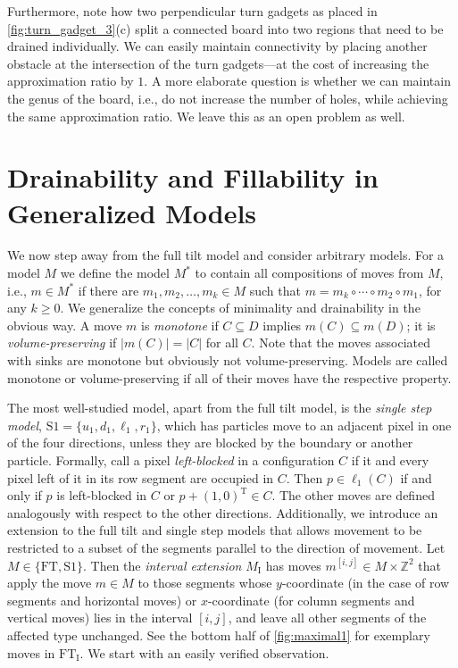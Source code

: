 \documentclass[a4paper,UKenglish,cleveref,thm-restate]{lipics-v2021}
\newcommand{\ZZ}{\ensuremath{\mathbb{Z}^2}}
\newcommand{\Tpose}{\ensuremath{\mathrm{T}}}
\newcommand{\FT}{\ensuremath{\mathrm{FT}}\xspace}
\newcommand{\SSt}{\ensuremath{\mathrm{S1}}\xspace}
\newcommand{\IE}[1][\FT]{\ensuremath{{#1}_\mathrm{I}}\xspace}
\newcommand{\mSeq}[1][k]{\ensuremath{m_1,m_2,\ldots,m_{#1}}}
\newcommand{\mComp}[1][k]{\ensuremath{m_{#1}\circ\cdots\circ m_2 \circ m_1}}
\begin{document}
Furthermore, note how two perpendicular turn gadgets as placed
in \cref{fig:turn_gadget_3}(c) split a connected board into two regions that
need to be drained individually. We can easily maintain connectivity by placing
another obstacle at the intersection of the turn gadgets---at the cost of
increasing the approximation ratio by $1$. A more elaborate question is whether
we can maintain the genus of the board, i.e., do not increase the number of
holes, while achieving the same approximation ratio. We leave this as an open
problem as well.
      \section{Drainability and Fillability in Generalized Models}\label{sec:models}

We now step away from the full tilt model and consider arbitrary models. For a model $M$ we
define the model $M^*$ to contain all compositions of moves from $M$, i.e., \(m
\in M^*\) if there are $\mSeq \in M$ such that $m = \mComp$, for any \(k \geq
0\). We generalize the concepts of minimality and drainability in the obvious
way. A move $m$ is \emph{monotone} if \(C \subseteq D\) implies \(m(C) \subseteq
m(D)\); it is \emph{volume-preserving} if \(|m(C)| = |C|\) for all $C$. Note
that the moves associated with sinks are monotone but obviously not
volume-preserving. Models are called monotone or volume-preserving if all of
their moves have the respective property.

The most well-studied model, apart from the full tilt model, is the
\emph{single step model}, \(\SSt = \{u_1, d_1, \ell_1, r_1\}\), which has
particles move to an adjacent pixel in one of the four directions, unless they
are blocked by the boundary or another particle. Formally, call a pixel
\emph{left-blocked} in a configuration $C$ if it and every pixel left of it in
its row segment are occupied in $C$. Then \(p \in \ell_1(C)\) if and only if $p$
is left-blocked in $C$ or \(p + (1,0)^\Tpose \in C\). The other moves are
defined analogously with respect to the other directions. Additionally, we
introduce an extension to the full tilt and single step models that allows
movement to be restricted to a subset of the segments parallel to the direction
of movement. Let $M \in \{\FT, \SSt\}$. Then the \emph{interval extension}
$\IE[M]$ has moves $m^{[i,j]} \in M \times \ZZ$ that apply the move $m \in M$ to
those segments whose $y$-coordinate (in the case of row segments and horizontal
moves) or $x$-coordinate (for column segments and vertical moves) lies in the
interval $[i,j]$, and leave all other segments of the affected type unchanged.
See the bottom half of \cref{fig:maximal1} for exemplary moves in \IE.
We start with an easily verified observation.
\end{document}
